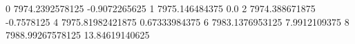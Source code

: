 0 7974.2392578125 -0.9072265625
1 7975.146484375 0.0
2 7974.388671875 -0.7578125
4 7975.81982421875 0.67333984375
6 7983.1376953125 7.9912109375
8 7988.99267578125 13.84619140625
